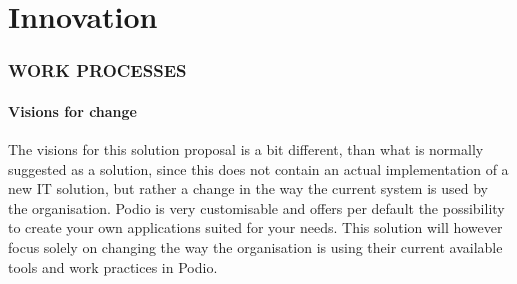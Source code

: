\part{Innovation}





\section{WORK PROCESSES}
\subsection{Visions for change}
The visions for this solution proposal is a bit different, than what is normally suggested as a
solution, since this does not contain an actual implementation of a new IT solution, but rather a
change in the way the current system is used by the organisation.
Podio is very customisable and offers per default the possibility to create your own applications
suited for your needs. This solution will however focus solely on changing the way the organisation
is using their current available tools and work practices in Podio.


